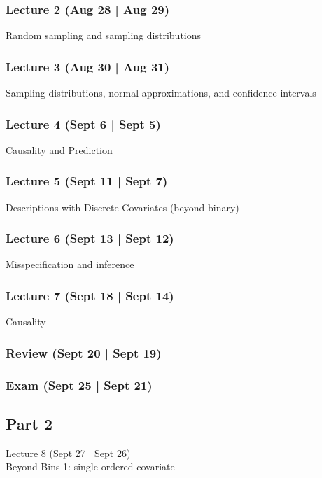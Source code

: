 \documentclass[12pt]{article}
\begin{document}
\subsubsection*{Lecture 2 (Aug 28 | Aug 29)}
Random sampling and sampling distributions 

\subsubsection*{Lecture 3 (Aug 30 | Aug 31)}
Sampling distributions, normal approximations, and confidence intervals



\subsubsection*{Lecture 4 (Sept 6 | Sept 5) }
Causality and Prediction




\subsubsection*{Lecture 5 (Sept 11 | Sept 7)}
Descriptions with Discrete Covariates (beyond binary)


\subsubsection*{Lecture 6 (Sept 13 | Sept 12)}
Misspecification and inference



\subsubsection*{Lecture 7 (Sept 18 | Sept 14)}
Causality



\subsubsection*{Review (Sept 20 | Sept 19)}



\subsubsection*{Exam (Sept 25 | Sept 21)}



\subsection*{Part 2}
Lecture 8 (Sept 27 | Sept 26)\\
Beyond Bins 1: single ordered covariate
\end{document}
